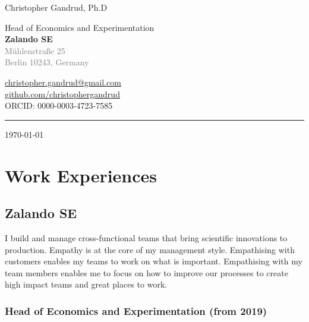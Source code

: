 \documentclass[a4paper]{article}
\begin{document}
    \begin{flushright}
        {\huge{Christopher Gandrud, Ph.D}} \\
        \vspace{0.251cm}

        Head of Economics and Experimentation \\
        {\bf{\large{Zalando SE}}} \\
        \textcolor{gray}{M\"{u}hlenstra{\ss}e 25\\
        Berlin 10243, Germany} \\
        \vspace{0.25cm}

        \href{mailto:christopher.gandrud@gmail.com}{christopher.gandrud@gmail.com}\\
        \href{https://github.com/christophergandrud}{github.com/christophergandrud}\\[0.25cm]

        ORCID: 0000-0003-4723-7585\\[0.25cm]

        \medskip\hrule height 1pt

        \vspace{0.5cm}

        \today

    \end{flushright}



\vspace{0.5cm}

\section*{Work Experiences}

\subsection*{Zalando SE}

I build and manage cross-functional teams that bring scientific innovations to production. Empathy is at the core of my management style. Empathising with customers enables my teams to work on what is important. Empathising with my team members enables me to focus on how to improve our processes to create high impact teams and great places to work. 

\subsubsection*{Head of Economics and Experimentation (from 2019)}
\end{document}
